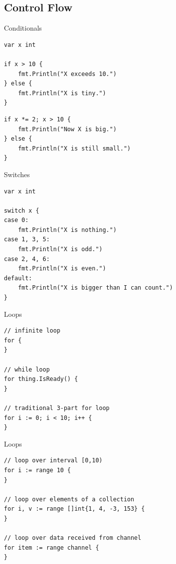\documentclass[pdf]{beamer}
\begin{document}
\subsection{Control Flow}
\begin{frame}[fragile]{Conditionals}
\begin{lstlisting}
var x int

if x > 10 {
    fmt.Println("X exceeds 10.")
} else {
    fmt.Println("X is tiny.")
}
\end{lstlisting}
\pause
\begin{lstlisting}
if x *= 2; x > 10 {
    fmt.Println("Now X is big.")
} else {
    fmt.Println("X is still small.")
}
\end{lstlisting}
\end{frame}
\begin{frame}[fragile]{Switches}
\begin{lstlisting}
var x int

switch x {
case 0:
    fmt.Println("X is nothing.")
case 1, 3, 5:
    fmt.Println("X is odd.")
case 2, 4, 6:
    fmt.Println("X is even.")
default:
    fmt.Println("X is bigger than I can count.")
}
\end{lstlisting}
\end{frame}
\begin{frame}[fragile]{Loops}
\begin{lstlisting}
// infinite loop
for {
}

// while loop
for thing.IsReady() {
}

// traditional 3-part for loop
for i := 0; i < 10; i++ {
}
\end{lstlisting}
\end{frame}

\begin{frame}[fragile]{Loops}
\begin{lstlisting}
// loop over interval [0,10)
for i := range 10 {
}

// loop over elements of a collection
for i, v := range []int{1, 4, -3, 153} {
}

// loop over data received from channel
for item := range channel {
}
\end{lstlisting}
\end{frame}
\end{document}
